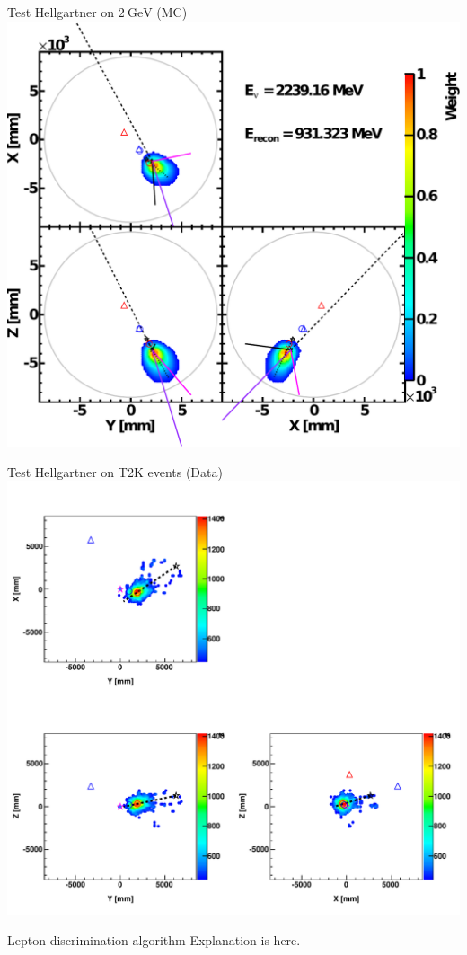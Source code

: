 \documentclass[14pt]{beamer}
\begin{document}
\begin{frame}{Test Hellgartner on
	$\SI{2}{\giga\electronvolt}$ \Pnue (MC)}
	\centering
	\includegraphics[width=0.8\linewidth]{hellgartner_reconstruction_2gev_nue_klg4sim.pdf}
\end{frame}

\begin{frame}{Test Hellgartner on T2K events (Data)}
	\centering
	\includegraphics[width=0.8\linewidth]{fom_map__run11331_evt29962767.pdf}
\end{frame}

\begin{frame}{Lepton discrimination algorithm}
	Explanation is here.
\end{frame}
\end{document}

